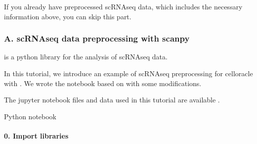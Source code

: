\documentclass[letterpaper,10pt,english]{sphinxmanual}
\begin{document}
If you already have preprocessed scRNA\sphinxhyphen{}seq data, which includes the necessary information above, you can skip this part.


\subsubsection{A. scRNA\sphinxhyphen{}seq data preprocessing with scanpy}
\label{\detokenize{tutorials/scrnaprocess:a-scrna-seq-data-preprocessing-with-scanpy}}
 is a python library for the analysis of scRNA\sphinxhyphen{}seq data.

In this tutorial, we introduce an example of scRNA\sphinxhyphen{}seq preprocessing for celloracle with .
We wrote the notebook based on  with some modifications.

The jupyter notebook files and data used in this tutorial are available  .

Python notebook


\paragraph{0. Import libraries}
\label{\detokenize{notebooks/03_scRNA-seq_data_preprocessing/scanpy_preprocessing_with_Paul_etal_2015_data:0.-Import-libraries}}\label{\detokenize{notebooks/03_scRNA-seq_data_preprocessing/scanpy_preprocessing_with_Paul_etal_2015_data::doc}}
{
\begin{sphinxVerbatim}[commandchars=\\\{\}]
\llap{\color{nbsphinxin}[1]:\,\hspace{\fboxrule}\hspace{\fboxsep}} 
   
   
   
   
\end{sphinxVerbatim}
}
\end{document}
